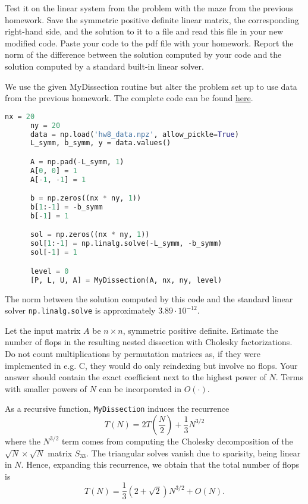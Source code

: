 \documentclass{../kin_math}
\begin{document}
\begin{questions}
  Test it on the linear system from the problem with the maze from the previous
  homework. Save the symmetric positive definite linear matrix, the corresponding
  right-hand side, and the solution to it to a file and read this file in your new modified code. Paste your code to the pdf file with your homework. Report the norm of the difference between the solution computed by your code and the solution computed by a standard built-in linear solver.
  \begin{solution}
    We use the given MyDissection routine but alter the problem set up to use data from the previous homework. The complete code can be found \href{https://github.com/elijahkin/amsc660/blob/main/hw9/hw9.ipynb}{here}.
    \begin{lstlisting}[language=Python]
      nx = 20
      ny = 20
      data = np.load('hw8_data.npz', allow_pickle=True)
      L_symm, b_symm, y = data.values()

      A = np.pad(-L_symm, 1)
      A[0, 0] = 1
      A[-1, -1] = 1

      b = np.zeros((nx * ny, 1))
      b[1:-1] = -b_symm
      b[-1] = 1

      sol = np.zeros((nx * ny, 1))
      sol[1:-1] = np.linalg.solve(-L_symm, -b_symm)
      sol[-1] = 1

      level = 0
      [P, L, U, A] = MyDissection(A, nx, ny, level)
    \end{lstlisting}
    The norm between the solution computed by this code and the standard linear solver \texttt{np.linalg.solve} is approximately $3.89 \cdot 10^{-12}$.
  \end{solution}

  \question Let the input matrix $A$ be $n \times n$, symmetric positive definite. Estimate the number of flops in the resulting nested dissection with Cholesky factorizations. Do not count multiplications by permutation matrices as, if they were implemented in e.g. C, they would do only reindexing but involve no flops. Your answer should contain the exact coefficient next to the highest power of $N$. Terms with smaller powers of $N$ can be incorporated in $O(\cdot)$.
  \begin{solution}
    As a recursive function, \texttt{MyDissection} induces the recurrence
    \begin{equation*}
      T(N) = 2T\left(\frac{N}{2}\right) + \frac{1}{3} N^{3 / 2}
    \end{equation*}
    where the $N^{3 / 2}$ term comes from computing the Cholesky decomposition of the $\sqrt{N} \times \sqrt{N}$ matrix $S_{33}$. The triangular solves vanish due to sparisity, being linear in $N$. Hence, expanding this recurrence, we obtain that the total number of flops is
    \begin{equation*}
      T(N) = \frac{1}{3}(2 + \sqrt{2}) N^{3 / 2} + O(N).
    \end{equation*}
  \end{solution}
\end{questions}
\end{document}
